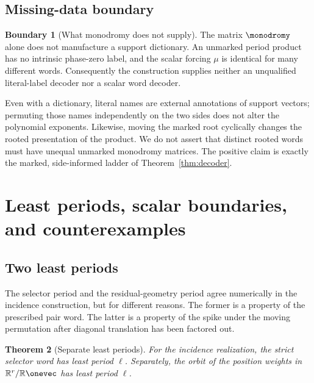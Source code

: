 \documentclass[11pt,letterpaper]{article}
\newtheorem{theorem}{Theorem}[section]
\theoremstyle{definition}
\newtheorem{boundary}[theorem]{Boundary}
\theoremstyle{remark}
\numberwithin{equation}{section}
\begin{document}
\subsection{Missing-data boundary}

\begin{boundary}[What monodromy does not supply]
\label{rem:decoder-boundary}
The matrix \(\monodromy\) alone does not manufacture a support dictionary.
An unmarked period product has no intrinsic phase-zero label, and the scalar
forcing \(\mu\) is identical for many different words.  Consequently the
construction supplies neither an unqualified literal-label decoder nor a
scalar word decoder.
\end{boundary}

Even with a dictionary, literal names are external annotations of support
vectors; permuting those names independently on the two sides does not alter
the polynomial exponents.  Likewise, moving the marked root cyclically
changes the rooted presentation of the product.  We do not assert that
distinct rooted words must have unequal unmarked monodromy matrices.  The
positive claim is exactly the marked, side-informed ladder of
Theorem~\ref{thm:decoder}.

\section{Least periods, scalar boundaries, and counterexamples}

\subsection{Two least periods}

The selector period and the residual-geometry period agree numerically in
the incidence construction, but for different reasons.  The former is a
property of the prescribed pair word.  The latter is a property of the spike
under the moving permutation after diagonal translation has been factored
out.

\begin{theorem}[Separate least periods]
\label{thm:least-periods}
For the incidence realization, the strict selector word has least period
\(\ell\).  Separately, the orbit of the position weights in
\(\mathbb R^r/\mathbb R\onevec\) has least period \(\ell\).
\end{theorem}
\end{document}

